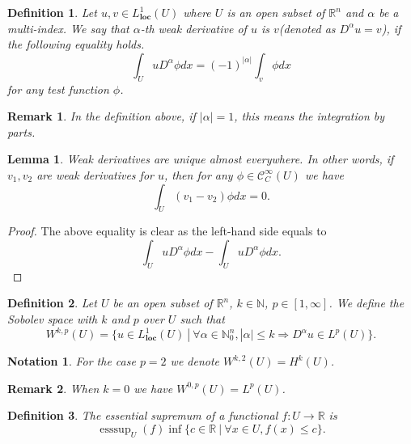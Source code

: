 \documentclass{article}
\newtheorem{definition}{Definition}[section]
\newtheorem{lemma}{Lemma}[section]
\newtheorem{notation}{Notation}[section]
\newtheorem{remark}{Remark}[section]
\numberwithin{equation}{section}
\DeclareMathOperator{\esssup}{esssup}
\begin{document}
\begin{definition}
Let $u,v\in L^1_{\mathbf{loc}}(U)$ where $U$ is an open subset of $\mathbb{R}^n$ and $\alpha$ be a multi-index. We say that $\alpha$-th weak derivative of $u$ is $v$(denoted as $D^\alpha u=v$), if the following equality holds.
\begin{equation*}
\int_U uD^\alpha\phi dx = (-1)^{|\alpha|}\int_v\phi dx
\end{equation*}
for any test function $\phi$. 
\end{definition}

\begin{remark}
In the definition above, if $|\alpha|=1$, this means the integration by parts.
\end{remark}

\begin{lemma}
Weak derivatives are unique almost everywhere. In other words, if $v_1,v_2$ are weak derivatives for $u$, then for any $\phi\in\mathcal{C}^\infty_C(U)$ we have
\begin{equation*}
\int_U (v_1-v_2)\phi dx = 0.
\end{equation*}
\end{lemma}

\begin{proof}
The above equality is clear as the left-hand side equals to 
\begin{equation*}\int_U uD^\alpha \phi dx-\int_U uD^\alpha \phi dx.
\end{equation*}
\end{proof}

\begin{definition}
Let $U$ be an open subset of $\mathbb{R}^n$, $k\in\mathbb{N}$, $p\in[1,\infty]$. We define the Sobolev space with $k$ and $p$ over $U$ such that 
\begin{equation*}
W^{k,p}(U) = \{u\in L^1_{\mathbf{loc}}(U)\:|\: \forall \alpha\in\mathbb{N}_0^n, |\alpha|\leq k \Rightarrow D^\alpha u\in L^p(U)\}.
\end{equation*}
\end{definition}

\begin{notation}
For the case $p=2$ we denote $W^{k,2}(U) = H^k(U)$. 
\end{notation}

\begin{remark}
When $k=0$ we have $W^{0,p}(U) = L^p(U)$.
\end{remark}

\begin{definition}
The essential supremum of a functional $f:U\to\mathbb{R}$ is 
\begin{equation*}
\esssup_U(f)\inf\{c\in\mathbb{R}\:|\: \forall x\in U, f(x)\leq c\}.
\end{equation*}
\end{definition}
\end{document}
